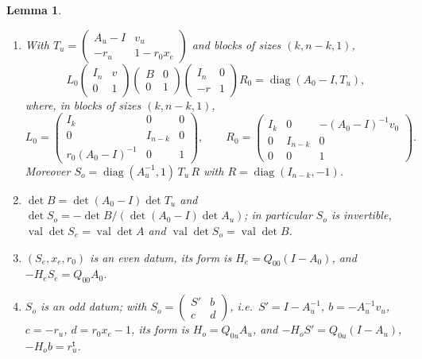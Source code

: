 \documentclass[11pt,oneside,notitlepage]{book}
\numberwithin{equation}{section}
\theoremstyle{plain}
\newtheorem{lemma}[theorem]{Lemma}
\theoremstyle{definition}
\newcommand{\val}{\operatorname{val}}
\newcommand{\diag}{\operatorname{diag}}
\begin{document}
\begin{lemma}\label{lem:factor-identities}
\begin{enumerate}[label=(\alph*)]
\item With $T_u=\left(\begin{smallmatrix}A_u-I&v_u\\-r_u&1-r_0x_e\end{smallmatrix}\right)$ and blocks of sizes $(k,n-k,1)$,
\[L_0\begin{pmatrix}I_n&v\\0&1\end{pmatrix}\begin{pmatrix}B&0\\0&1\end{pmatrix}\begin{pmatrix}I_n&0\\-r&1\end{pmatrix}R_0=\diag(A_0-I,T_u),\]
where, in blocks of sizes $(k,n-k,1)$,
\[L_0=\begin{pmatrix}I_k&0&0\\0&I_{n-k}&0\\r_0(A_0-I)^{-1}&0&1\end{pmatrix},\qquad R_0=\begin{pmatrix}I_k&0&-(A_0-I)^{-1}v_0\\0&I_{n-k}&0\\0&0&1\end{pmatrix}.\] Moreover $S_o=\diag(A_u^{-1},1)\,T_u\,R$ with $R=\diag(I_{n-k},-1)$.
\item $\det B=\det(A_0-I)\det T_u$ and $\det S_o=-\det B/(\det(A_0-I)\det A_u)$; in particular $S_o$ is invertible, $\val\det S_e=\val\det A$ and $\val\det S_o=\val\det B$.
\item $(S_e,x_e,r_0)$ is an even datum, its form is $H_e=Q_{00}(I-A_0)$, and $-H_eS_e=Q_{00}A_0$.
\item $S_o$ is an odd datum; with $S_o=\left(\begin{smallmatrix}S'&b\\c&d\end{smallmatrix}\right)$, i.e.\ $S'=I-A_u^{-1}$, $b=-A_u^{-1}v_u$, $c=-r_u$, $d=r_0x_e-1$, its form is $H_o=Q_{0u}A_u$, and $-H_oS'=Q_{0u}(I-A_u)$, $-H_ob=r_u^{\mathsf t}$.
\end{enumerate}
\end{lemma}
\end{document}
